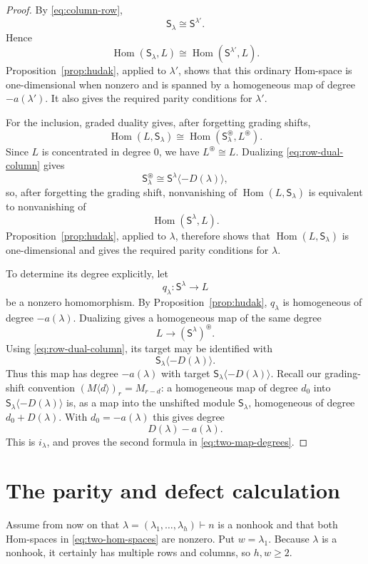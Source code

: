 \documentclass[11pt,reqno]{amsart}
\numberwithin{equation}{section}
\theoremstyle{remark}
\newcommand{\Hom}{\operatorname{Hom}}
\newcommand{\RS}{\mathsf S}
\newcommand{\CS}{\mathsf S}
\begin{document}
\begin{proof}
By \eqref{eq:column-row},
\[
\CS_\lambda\cong\RS^{\lambda'}.
\]
Hence
\[
\Hom(\CS_\lambda,L)
\cong
\Hom(\RS^{\lambda'},L).
\]
Proposition~\ref{prop:hudak}, applied to $\lambda'$, shows that this
ordinary Hom-space is one-dimensional when nonzero and is spanned by
a homogeneous map of degree $-a(\lambda')$.  It also gives the required
parity conditions for $\lambda'$.

For the inclusion, graded duality gives, after forgetting grading
shifts,
\[
\Hom(L,\CS_\lambda)
\cong
\Hom(\CS_\lambda^{\circledast},L^{\circledast}).
\]
Since $L$ is concentrated in degree $0$, we have
$L^{\circledast}\cong L$.  Dualizing \eqref{eq:row-dual-column} gives
\[
\CS_\lambda^{\circledast}\cong \RS^\lambda\langle-D(\lambda)\rangle,
\]
so, after forgetting the grading shift, nonvanishing of
$\Hom(L,\CS_\lambda)$ is equivalent to nonvanishing of
\[
\Hom(\RS^\lambda,L).
\]
Proposition~\ref{prop:hudak}, applied to $\lambda$, therefore shows
that $\Hom(L,\CS_\lambda)$ is one-dimensional and gives the required
parity conditions for $\lambda$.

To determine its degree explicitly, let
\[
q_\lambda:\RS^\lambda\longrightarrow L
\]
be a nonzero homomorphism.  By Proposition~\ref{prop:hudak},
$q_\lambda$ is homogeneous of degree $-a(\lambda)$.  Dualizing gives
a homogeneous map of the same degree
\[
L\longrightarrow(\RS^\lambda)^{\circledast}.
\]
Using \eqref{eq:row-dual-column}, its target may be identified with
\[
\CS_\lambda\langle-D(\lambda)\rangle.
\]
Thus this map has degree $-a(\lambda)$ with target
$\CS_\lambda\langle-D(\lambda)\rangle$.  Recall our grading-shift
convention $(M\langle d\rangle)_r=M_{r-d}$: a homogeneous map of
degree $d_0$ into $\CS_\lambda\langle-D(\lambda)\rangle$ is, as a map
into the unshifted module $\CS_\lambda$, homogeneous of degree
$d_0+D(\lambda)$.  With $d_0=-a(\lambda)$ this gives degree
\[
D(\lambda)-a(\lambda).
\]
This is $i_\lambda$, and proves the second formula in
\eqref{eq:two-map-degrees}.
\end{proof}

\section{The parity and defect calculation}

Assume from now on that $\lambda=(\lambda_1,\ldots,\lambda_h)\vdash n$ is a nonhook and that both Hom-spaces in \eqref{eq:two-hom-spaces} are nonzero.  Put $w=\lambda_1.$
Because $\lambda$ is a nonhook, it certainly has multiple rows and columns, so $h,w\ge2$.
\end{document}
